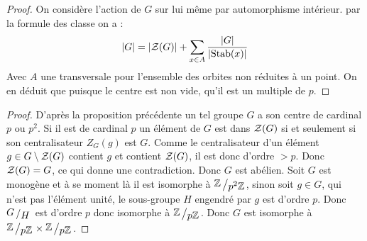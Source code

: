 
\begin{proof} 
	On considère l'action de $G$ sur lui même par automorphisme intérieur. par la formule des classe on a :
	\[
		\vert G \vert = \vert \mathcal{Z}(G) \vert + \sum_{x\in A} \frac{\vert G \vert}{\vert \textup{Stab}(x) \vert }
	\]
	Avec $A$ une transversale pour l'ensemble des orbites non réduites à un point. On en déduit que puisque le centre est non vide, qu'il est un multiple de $p$.
\end{proof}



\begin{proof} 
	D'après la proposition précédente un tel groupe $G$ a son centre de cardinal $p$ ou $p^2$. Si il est de cardinal $p$ un élément de $G$ est dans $\mathcal{Z}(G)$ si et seulement si son centralisateur $Z_G(g)$ est $G$. Comme le centralisateur d'un élément $g \in G\setminus \mathcal{Z}(G)$ contient $g$ et contient $\mathcal{Z}(G)$, il est donc d'ordre $>p$. Donc $\mathcal{Z}(G)= G$, ce qui donne une contradiction. Donc $G$ est abélien. Soit $G$ est monogène et à se moment là il est isomorphe à $\bigslant{\ZZ}{p^2\ZZ}$, sinon soit $g \in G$, qui n'est pas l'élément unité, le sous-groupe $H$ engendré par $g$ est d'ordre $p$. Donc $\bigslant{G}{H}$ est d'ordre $p$ donc isomorphe à $\bigslant{\ZZ}{p\ZZ}$. Donc $G$ est isomorphe à $\bigslant{\ZZ}{p\ZZ} \times \bigslant{\ZZ}{p\ZZ}$.
\end{proof}
